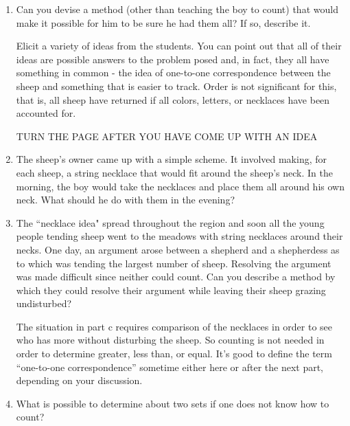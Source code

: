 \documentclass{ximera}
\begin{document}
\begin{enumerate}

\item	Can you devise a method (other than teaching the boy to count) that would make it possible for him to be sure he had them all?  If so, describe it.

\begin{instructorNotes}
Elicit a variety of ideas from the students.  You can point out that all of their ideas are possible answers to the problem posed and, in fact, they all have something in common - the idea of one-to-one correspondence between the sheep and something that is easier to track.  Order is not significant for this, that is, all sheep have returned if all colors, letters, or necklaces have been accounted for.
\end{instructorNotes}





\vfill


TURN THE PAGE AFTER YOU HAVE COME UP WITH AN IDEA

\newpage
 
\item 	The sheep's owner came up with a simple scheme.  It involved making, for each sheep, a string necklace that would fit around the sheep's neck.  In the morning, the boy would take the necklaces and place them all around his own neck.  What should he do with them in the evening?
\vskip 1in

\item 	The ``necklace idea" spread throughout the region and soon all the young people tending sheep went to the meadows with string necklaces around their necks. One day, an argument arose between a shepherd and a shepherdess as to which was tending the largest number of sheep. Resolving the argument was made difficult since neither could count. Can you describe a method by which they could resolve their argument while leaving their sheep grazing undisturbed?
\vskip 1.5in
\begin{instructorNotes}
The situation in part c requires comparison of the necklaces in order to see who has more without disturbing the sheep.  So counting is not needed in order to determine greater, less than, or equal. It's good to define the term ``one-to-one correspondence'' sometime either here or after the next part, depending on your discussion.
\end{instructorNotes}
\item 	What is possible to determine about two sets if one does not know how to count?


\end{enumerate}
\end{document}
